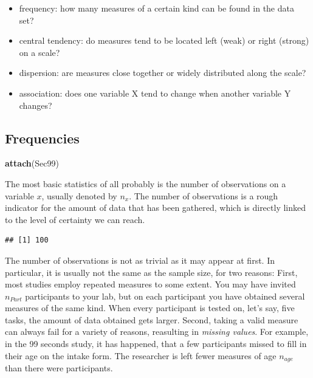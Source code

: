 \documentclass[]{svmono}
\newenvironment{Shaded}{\begin{snugshade}}{\end{snugshade}}
\newcommand{\KeywordTok}[1]{\textcolor[rgb]{0.13,0.29,0.53}{\textbf{#1}}}
\newcommand{\OperatorTok}[1]{\textcolor[rgb]{0.81,0.36,0.00}{\textbf{#1}}}
\newcommand{\NormalTok}[1]{#1}
\providecommand{\tightlist}{%
  \setlength{\itemsep}{0pt}\setlength{\parskip}{0pt}}
\theoremstyle{definition}
\theoremstyle{definition}
\theoremstyle{definition}
\theoremstyle{remark}
\begin{document}
\begin{itemize}
\tightlist
\item
  frequency: how many measures of a certain kind can be found in the
  data set?
\item
  central tendency: do measures tend to be located left (weak) or right
  (strong) on a scale?
\item
  dispersion: are measures close together or widely distributed along
  the scale?
\item
  association: does one variable X tend to change when another variable
  Y changes?
\end{itemize}

\subsection{Frequencies}\label{frequencies}

\begin{Shaded}
\begin{Highlighting}[]
\KeywordTok{attach}\NormalTok{(Sec99)}
\end{Highlighting}
\end{Shaded}

The most basic statistics of all probably is the number of observations
on a variable \(x\), usually denoted by \(n_{x}\). The number of
observations is a rough indicator for the amount of data that has been
gathered, which is directly linked to the level of certainty we can
reach.

\begin{Shaded}
\end{Shaded}

\begin{verbatim}
## [1] 100
\end{verbatim}

The number of observations is not as trivial as it may appear at first.
In particular, it is usually not the same as the sample size, for two
reasons: First, most studies employ repeated measures to some extent.
You may have invited \(n_{Part}\) participants to your lab, but on each
participant you have obtained several measures of the same kind. When
every participant is tested on, let's say, five tasks, the amount of
data obtained gets larger. Second, taking a valid measure can always
fail for a variety of reasons, reasulting in \emph{missing values}. For
example, in the 99 seconds study, it has happened, that a few
participants missed to fill in their age on the intake form. The
researcher is left fewer measures of age \(n_{age}\) than there were
participants.
\end{document}
